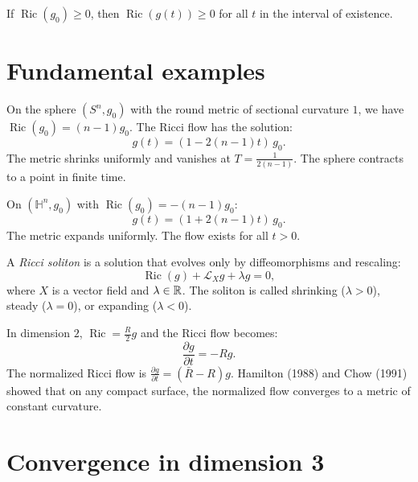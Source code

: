 \begin{corollary}
If $\operatorname{Ric}(g_0) \geq 0$, then $\operatorname{Ric}(g(t)) \geq 0$
for all $t$ in the interval of existence.
\end{corollary}

\section{Fundamental examples}

\begin{example}[Sphere $S^n$]
On the sphere $(S^n, g_0)$ with the round metric of sectional curvature $1$, we have
$\operatorname{Ric}(g_0) = (n-1)g_0$. The Ricci flow has the solution:
\[
    g(t) = (1 - 2(n-1)t)\, g_0.
\]
The metric shrinks uniformly and vanishes at $T = \frac{1}{2(n-1)}$. The sphere
contracts to a point in finite time.
\end{example}

\begin{example}
On $(\mathbb{H}^n, g_0)$ with $\operatorname{Ric}(g_0) = -(n-1)g_0$:
\[
    g(t) = (1 + 2(n-1)t)\, g_0.
\]
The metric expands uniformly. The flow exists for all $t > 0$.
\end{example}

\begin{example}
A \emph{Ricci soliton} is a solution that evolves only by diffeomorphisms and
rescaling:
\[
    \operatorname{Ric}(g) + \mathcal{L}_X g + \lambda g = 0,
\]
where $X$ is a vector field and $\lambda \in \mathbb{R}$. The soliton is called
shrinking ($\lambda > 0$), steady ($\lambda = 0$), or expanding ($\lambda < 0$).
\end{example}

\begin{example}
In dimension $2$, $\operatorname{Ric} = \frac{R}{2}g$ and the Ricci flow becomes:
\[
    \frac{\partial g}{\partial t} = -Rg.
\]
The normalized Ricci flow is $\frac{\partial g}{\partial t} = (\bar{R} - R)g$.
Hamilton (1988) and Chow (1991) showed that on any compact surface, the normalized
flow converges to a metric of constant curvature.
\end{example}

\section{Convergence in dimension 3}

